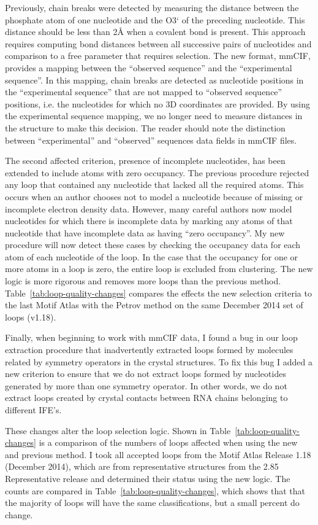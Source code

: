 Previously, chain breaks were detected by measuring the distance between the
phosphate atom of one nucleotide and the O3` of the preceding nucleotide. This
distance should be less than 2{\AA} \cite{Petrov2012} when a covalent bond is
present. This approach requires computing bond distances between all successive
pairs of nucleotides and comparison to a free parameter that requires selection.
The new format, mmCIF, provides a mapping between the ``observed sequence'' and
the ``experimental sequence''. In this mapping, chain breaks are detected as
nucleotide positions in the ``experimental sequence'' that are not mapped to
``observed sequence'' positions, i.e. the nucleotides for which no 3D coordinates are
provided. By using the experimental sequence mapping, we no longer need to
measure distances in the structure to make this decision. The reader should note
the distinction between ``experimental'' and ``observed'' sequences data fields
in mmCIF files.

The second affected criterion, presence of incomplete nucleotides, has been
extended to include atoms with zero occupancy. The previous procedure rejected
any loop that contained any nucleotide that lacked all the required atoms. This
occurs when an author chooses not to model a nucleotide because of missing  or
incomplete electron density data. However, many careful authors now model
nucleotides for which there is incomplete data by marking any atoms of that
nucleotide that have incomplete data as having ``zero occupancy''. My new
procedure will now detect these cases by checking the occupancy data for each
atom of each nucleotide of the loop. In the case that the occupancy for one or
more atoms in a loop is zero, the entire loop is excluded from clustering. The
new logic is more rigorous and removes more loops than the previous method.
Table~\ref{tab:loop-quality-changes} compares the effects the new selection
criteria to the last Motif Atlas with the Petrov method on the same December 2014
set of loops (v1.18).

Finally, when beginning to work with mmCIF data, I found a bug in our loop
extraction procedure that inadvertently extracted loops formed by molecules
related by symmetry operators in the crystal structures. To fix this bug I added
a new criterion to ensure that we do not extract loops formed by nucleotides
generated by more than one symmetry operator. In other words, we do not extract
loops created by crystal contacts between RNA chains belonging to different
IFE's.

These changes alter the loop selection logic. Shown in
Table~\ref{tab:loop-quality-changes} is a comparison of the numbers of loops
affected when using the new and previous method. I took all accepted loops from
the Motif Atlas Release 1.18 (December 2014), which are from representative
structures from the 2.85 Representative release and determined their status
using the new logic. The counts are compared in
Table~\ref{tab:loop-quality-changes}, which shows that that the majority of
loops will have the same classifications, but a small percent do change.

